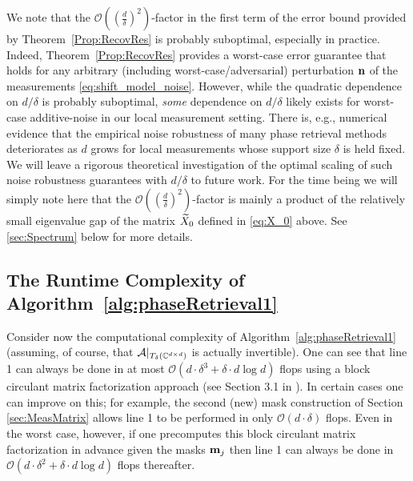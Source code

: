 We note that the  $\mathcal{O}\left( \left(\frac{d}{\delta} \right)^2 \right)$-factor in the first term of the error bound provided by Theorem~\ref{Prop:RecovRes} is probably suboptimal, especially in practice.  Indeed, Theorem~\ref{Prop:RecovRes} provides a worst-case error guarantee that holds for any arbitrary (including worst-case/adversarial) perturbation $\mathbf n$ of the measurements \eqref{eq:shift_model_noise}.  %
However, while the quadratic dependence on $d/\delta$ is probably suboptimal, \textit{some} dependence on $d/\delta$ likely exists for worst-case additive-noise in our local measurement setting.  There is, e.g., numerical evidence that the empirical noise robustness of many phase retrieval methods deteriorates as $d$ grows for local measurements whose support size $\delta$ is held fixed.  We will leave a rigorous theoretical investigation of the optimal scaling of such noise robustness guarantees with $d/\delta$ to future work.  For the time being we will simply note here that the $\mathcal{O}\left( \left(\frac{d}{\delta} \right)^2 \right)$-factor %
is mainly a product of the relatively small eigenvalue gap of the matrix $\widetilde{X}_0$ defined in \eqref{eq:X_0} above.  See \cref{sec:Spectrum} below for more details.

\subsection{The Runtime Complexity of Algorithm~\ref{alg:phaseRetrieval1}}
\label{sec:RuntimeAlg1}

Consider now the computational complexity of Algorithm~\ref{alg:phaseRetrieval1} (assuming, of course, that $\mathcal{A}|_{T_\delta(\mathbb{C}^{d\times d})}$ is actually invertible).  One can see that line 1 can  always be done in at most $\mathcal{O}(d \cdot \delta^3 + \delta \cdot d \log d)$ flops using a block circulant matrix factorization approach (see Section 3.1 in \cite{IVW2015_FastPhase}). In certain cases one can improve on this; for example, the second (new) mask construction of Section \ref{sec:MeasMatrix} allows line 1 to be performed in only $\mathcal{O}(d\cdot\delta)$ flops.  Even in the worst case, however, if one precomputes this block circulant matrix factorization in advance given the masks $\mathbf m_j$ then line 1 can always be done in $\mathcal{O}(d \cdot \delta^2 + \delta \cdot d \log d)$ flops thereafter.  

